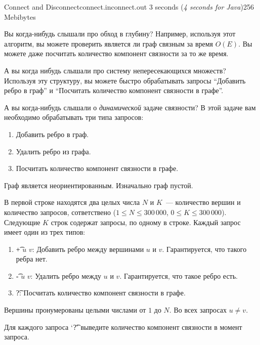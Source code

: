 \begin{problem}{Connect and Disconnect}{connect.in}{connect.out}
{3 seconds (\textit{4 seconds for Java})}{256 Mebibytes}{}


Вы когда-нибудь слышали про обход в глубину?
Например, используя этот алгоритм, вы можете проверить является ли
граф связным за время $O(E)$. Вы можете даже посчитать количество
компонент связности за то же время.

А вы когда нибудь слышали про систему непересекающихся множеств?
Используя эту структуру, вы можете быстро обрабатывать запросы ``Добавить ребро в граф'' и
``Посчитать количество компонент связности в графе''.

А вы когда-нибудь слышали о \textit{динамической} задаче связности?
В этой задаче вам необходимо обрабатывать три типа запросов:
\begin{enumerate}
  \setlength{\parskip}{-4pt}
  \setlength{\itemsep}{6pt}
  \item Добавить ребро в граф.
  \item Удалить ребро из графа.
  \item Посчитать количество компонент связности в графе.
\end{enumerate}

Граф является неориентированным. Изначально граф пустой.

\InputFile

В первой строке находятся два целых числа $N$ и $K$~--- количество вершин и количество
запросов, сответствено ($1 \le N \le 300\,000$, $0 \le K \le 300\,000$).
Следующие $K$ строк содержат запросы, по одному в строке.
Каждый запрос имеет один из трех типов:
\begin{enumerate}
  \setlength{\parskip}{-2pt}
  \setlength{\itemsep}{7pt}
  \item \t{+ $u$ $v$}: Добавить ребро между вершинами $u$ и $v$.
      Гарантируется, что такого ребра нет.
  \item \t{- $u$ $v$}: Удалить ребро между $u$ и $v$.
      Гарантируется, что такое ребро есть.
  \item \t{?}: Посчитать количество компонент связности в графе.
\end{enumerate}

Вершины пронумерованы целыми числами от $1$ до $N$. Во всех запросах $u \ne v$.

\OutputFile

Для каждого запроса `\t{?}' выведите количество компонент связности в момент запроса.

\Example
\begin{example}
%
\end{example}

\end{problem}
